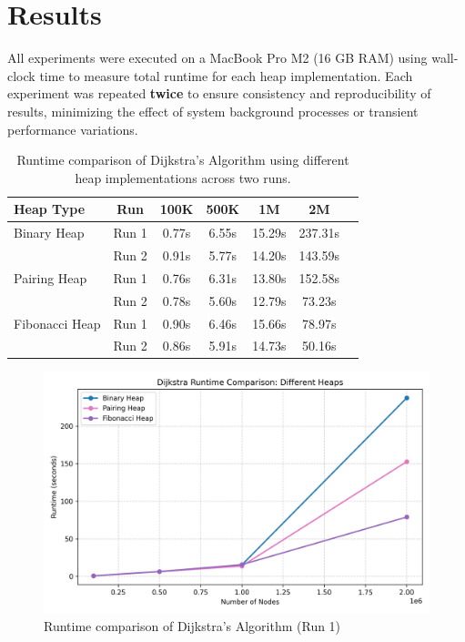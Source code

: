\documentclass[acmsmall]{acmart}
\begin{document}
\section{Results}
All experiments were executed on a MacBook Pro M2 (16 GB RAM) using wall-clock time to measure total runtime for each heap implementation. Each experiment was repeated \textbf{twice} to ensure consistency and reproducibility of results, minimizing the effect of system background processes or transient performance variations.

\begin{table}[H]
\centering
\caption{Runtime comparison of Dijkstra’s Algorithm using different heap implementations across two runs.}
\label{tab:runtimes}
\begin{tabular}{lcccccc}
\toprule
\textbf{Heap Type} & \textbf{Run} & \textbf{100K} & \textbf{500K} & \textbf{1M} & \textbf{2M} \\
\midrule
Binary Heap     & Run 1 & 0.77s & 6.55s & 15.29s & 237.31s \\
                 & Run 2 & 0.91s & 5.77s & 14.20s & 143.59s \\
\midrule
Pairing Heap    & Run 1 & 0.76s & 6.31s & 13.80s & 152.58s \\
                 & Run 2 & 0.78s & 5.60s & 12.79s & 73.23s \\
\midrule
Fibonacci Heap  & Run 1 & 0.90s & 6.46s & 15.66s & 78.97s \\
                 & Run 2 & 0.86s & 5.91s & 14.73s & 50.16s \\
\bottomrule
\end{tabular}
\end{table}

\begin{figure}[H]
  \centering
  \includegraphics[width=0.8\linewidth]{figs/runtime_comparison.png}
  \caption{Runtime comparison of Dijkstra’s Algorithm (Run 1)}
  \label{fig:runtime1}
\end{figure}
\end{document}
